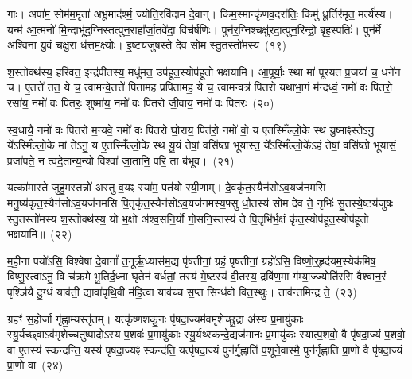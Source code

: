 गाः। अपा॑म॒ सोम॑म॒मृता॑ अभू॒माद॑र्श्म॒ ज्योति॒रवि॑दाम दे॒वान्। किम॒स्मान्कृ॑णव॒दरा॑तिः॒ किमु॑ धू॒र्तिर॑मृत॒ मर्त्य॑स्य। यन्म॑ आ॒त्मनो॑ मि॒न्दाभू॑द॒ग्निस्तत्पुन॒राहा᳚र्जा॒तवे॑दा॒ विच॑र्\mbox{}षणिः। पुन॑र॒ग्निश्चक्षु॑रदा॒त्पुन॒रिन्द्रो॒ बृह॒स्पतिः॑। पुन॑र्मे अश्विना यु॒वं चक्षु॒रा ध॑त्तम॒क्ष्योः। इ॒ष्टय॑जुषस्ते देव सोम स्तु॒तस्तो॑मस्य~(१९)\ip

श॒स्तोक्थ॑स्य॒ हरि॑वत॒ इन्द्र॑पीतस्य॒ मधु॑मत॒ उप॑हूत॒स्योप॑हूतो भक्षयामि। आ॒पूर्याः॒ स्था मा॑ पूरयत प्र॒जया॑ च॒ धने॑न च। ए॒तत्ते॑ तत॒ ये च॒ त्वामन्वे॒तत्ते॑ पितामह प्रपितामह॒ ये च॒ त्वामन्वत्र॑ पितरो यथाभा॒गं म॑न्दध्वं॒ नमो॑ वः पितरो॒ रसा॑य॒ नमो॑ वः पितरः॒ शुष्मा॑य॒ नमो॑ वः पितरो जी॒वाय॒ नमो॑ वः पितरः~(२०)\ip

स्व॒धायै॒ नमो॑ वः पितरो म॒न्यवे॒ नमो॑ वः पितरो घो॒राय॒ पित॑रो॒ नमो॑ वो॒ य ए॒तस्मिँ॑ल्लो॒के स्थ यु॒ष्माꣴस्ते\-ऽनु॒ ये᳚\-ऽस्मिँल्लो॒के मां ते\-ऽनु॒ य ए॒तस्मिँ॑ल्लो॒के स्थ यू॒यं तेषां॒ वसि॑ष्ठा भूयास्त॒ ये᳚\-ऽस्मिँल्लो॒के॑\-ऽहं तेषां॒ वसि॑ष्ठो भूयासं॒ प्रजा॑पते॒ न त्वदे॒तान्य॒न्यो विश्वा॑ जा॒तानि॒ परि॒ ता ब॑भूव।~(२१)\ip

यत्का॑मास्ते जुहु॒मस्तन्नो॑ अस्तु व॒यꣴ स्या॑म॒ पत॑यो रयी॒णाम्। दे॒वकृ॑त॒स्यैन॑सो\-ऽव॒यज॑नमसि मनु॒ष्य॑कृत॒स्यैन॑सो\-ऽ\-व॒यज॑नमसि पि॒तृकृ॑त॒स्यैन॑सो\-ऽव॒यज॑नमस्य॒फ्सु धौ॒तस्य॑ सोम देव ते॒ नृभिः॑ सु॒तस्ये॒ष्टय॑जुषः स्तु॒तस्तो॑मस्य श॒स्तोक्थ॑स्य॒ यो भ॒क्षो अ॑श्व॒सनि॒र्यो गो॒सनि॒स्तस्य॑ ते पि॒तृभि॑र्भ॒क्षं कृ॑त॒स्योप॑हूत॒स्योप॑हूतो भक्षयामि॥~(२२)\ip

{}

म॒ही॒नां पयो॑\-ऽसि॒ विश्वे॑षां दे॒वानां᳚ त॒नूर्\mbox{}ऋ॒ध्यास॑म॒द्य पृ॑षतीनां॒ ग्रहं॒ पृष॑तीनां॒ ग्रहो॑\-ऽसि॒ विष्णो॒र्॒\mbox{}हृद॑यम॒स्येक॑मिष॒ विष्णु॒स्त्वा\-ऽनु॒ वि च॑क्रमे भू॒तिर्द॒ध्ना घृ॒तेन॑ वर्धतां॒ तस्य॑ मे॒ष्टस्य॑ वी॒तस्य॒ द्रवि॑ण॒मा ग॑म्या॒ज्ज्योति॑रसि वैश्वान॒रं पृश्ञि॑यै दु॒ग्धं याव॑ती॒ द्यावा॑\-पृथि॒वी म॑हि॒त्वा याव॑च्च स॒प्त सिन्ध॑वो वित॒स्थुः। ताव॑न्तमिन्द्र ते॒~(२३)\ip

ग्रहꣳ॑ स॒होर्जा गृ॑ह्णा॒म्यस्तृ॑तम्। यत्कृ॑ष्णशकु॒नः पृ॑षदा॒ज्यम॑व\-मृ॒शेच्छू॒द्रा अ॑स्य प्र॒मायु॑काः स्यु॒र्यच्छ्वा\-ऽव॑मृ॒शेच्चतु॑ष्पादो\-ऽस्य प॒शवः॑ प्र॒मायु॑काः स्यु॒र्यथ्स्कन्दे॒द्यज॑मानः प्र॒मायु॑कः स्यात्प॒शवो॒ वै पृ॑षदा॒ज्यं प॒शवो॒ वा ए॒तस्य॑ स्कन्दन्ति॒ यस्य॑ पृषदा॒ज्यꣴ स्कन्द॑ति॒ यत्पृ॑षदा॒ज्यं पुन॑र्गृ॒ह्णाति॑ प॒शूने॒वास्मै॒ पुन॑र्गृह्णाति प्रा॒णो वै पृ॑षदा॒ज्यं प्रा॒णो वा~(२४)\ip


